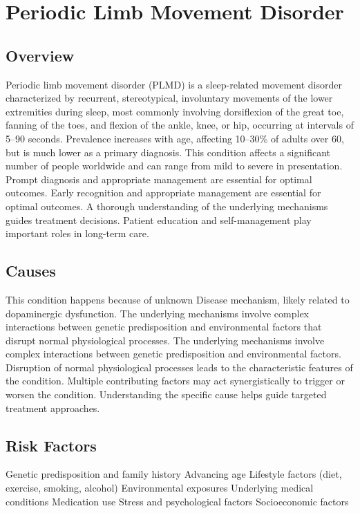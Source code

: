 \chapter{Periodic Limb Movement Disorder}
\label{sec:Periodic Limb Movement Disorder}

\section{Overview}
Periodic limb movement disorder (PLMD) is a sleep-related movement disorder characterized by recurrent, stereotypical, involuntary movements of the lower extremities during sleep, most commonly involving dorsiflexion of the great toe, fanning of the toes, and flexion of the ankle, knee, or hip, occurring at intervals of 5--90 seconds. Prevalence increases with age, affecting 10--30\% of adults over 60, but is much lower as a primary diagnosis. This condition affects a significant number of people worldwide and can range from mild to severe in presentation. Prompt diagnosis and appropriate management are essential for optimal outcomes. Early recognition and appropriate management are essential for optimal outcomes. A thorough understanding of the underlying mechanisms guides treatment decisions. Patient education and self-management play important roles in long-term care.
\section{Causes}
This condition happens because of unknown Disease mechanism, likely related to dopaminergic dysfunction. The underlying mechanisms involve complex interactions between genetic predisposition and environmental factors that disrupt normal physiological processes. The underlying mechanisms involve complex interactions between genetic predisposition and environmental factors. Disruption of normal physiological processes leads to the characteristic features of the condition. Multiple contributing factors may act synergistically to trigger or worsen the condition. Understanding the specific cause helps guide targeted treatment approaches.
\section{Risk Factors}
Genetic predisposition and family history Advancing age Lifestyle factors (diet, exercise, smoking, alcohol) Environmental exposures Underlying medical conditions Medication use Stress and psychological factors Socioeconomic factors

